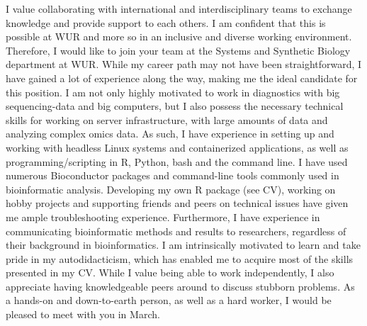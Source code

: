 \documentclass[11pt, a4paper]{awesome-cv}
\begin{document}
\begin{cvletter}
I value collaborating with international and interdisciplinary teams to exchange knowledge and provide support to each others.
I am confident that this is possible at WUR and more so in an inclusive and diverse working environment.
Therefore, I would like to join your team at the Systems and Synthetic Biology department at WUR.
While my career path may not have been straightforward, I have gained a lot of experience along the way, making me the ideal candidate for this position. 
I am not only highly motivated to work in diagnostics with big sequencing-data and big computers, but I also possess the necessary technical skills for working on server infrastructure, with large amounts of data and analyzing complex omics data.
As such, I have experience in setting up and working with headless Linux systems and containerized applications, as well as programming/scripting in R, Python, bash and the command line.
I have used numerous Bioconductor packages and command-line tools commonly used in bioinformatic analysis. 
Developing my own R package (see CV), working on hobby projects and supporting friends and peers on technical issues have given me ample troubleshooting experience. 
Furthermore, I have experience in communicating bioinformatic methods and results to researchers, regardless of their background in bioinformatics.
I am intrinsically motivated to learn and take pride in my autodidacticism, which has enabled me to acquire most of the skills presented in my CV. 
While I value being able to work independently, I also appreciate having knowledgeable peers around to discuss stubborn problems. 
As a hands-on and down-to-earth person, as well as a hard worker, I would be pleased to meet with you in March.
\end{cvletter}
\makeletterclosing
\end{document}
